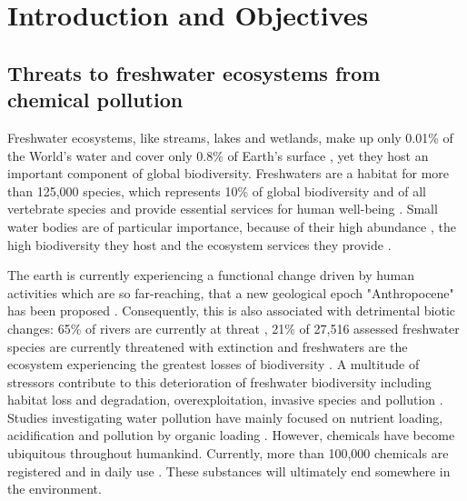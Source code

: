 
\chapter{Introduction and Objectives}
\label{sec:introduction} 

\section{Threats to freshwater ecosystems from chemical pollution}

Freshwater ecosystems, like streams, lakes and wetlands, make up only 0.01\% of the World's water and cover only 0.8\% of Earth's surface \citep{dudgeon_freshwater_2006}, yet they host an important component of global biodiversity. 
Freshwaters are a habitat for more than 125,000 species, which represents 10\% of global biodiversity and  of all vertebrate species \citep{balian_freshwater_2007,  strayer_freshwater_2010} and provide essential services for human well-being \citep{aylward_freshwater_2005}. 
Small water bodies are of particular importance, because of their high abundance \citep{downing_global_2012}, the high biodiversity they host \citep{davies_comparative_2008} and the ecosystem services they provide \citep{biggs_importance_2016}. 

The earth is currently experiencing a functional change driven by human activities which are so far-reaching, that a new geological epoch "Anthropocene" has been proposed \citep{steffen_2011, waters_anthropocene_2016}. 
Consequently, this is also associated with detrimental biotic changes: 65\% of rivers are currently at threat \citep{vorosmarty_global_2010}, 21\% of 27,516 assessed freshwater species are currently threatened with extinction \citep{iucn_iucn_2016} and freshwaters are the ecosystem experiencing the greatest losses of biodiversity \citep{wwf_living_2016}. 
A multitude of stressors contribute to this deterioration of freshwater biodiversity including habitat loss and degradation, overexploitation, invasive species and pollution \citep{dudgeon_freshwater_2006, vorosmarty_global_2010, wwf_living_2016}. 
Studies investigating water pollution have mainly focused on nutrient loading, acidification and pollution by organic loading \citep{schafer_contribution_2016}. 
However, chemicals have become ubiquitous throughout humankind. 
Currently, more than 100,000 chemicals are registered and in daily use \citep{schwarzman_new_2009, schwarzenbach_global_2010}. 
These substances will ultimately end somewhere in the environment.

